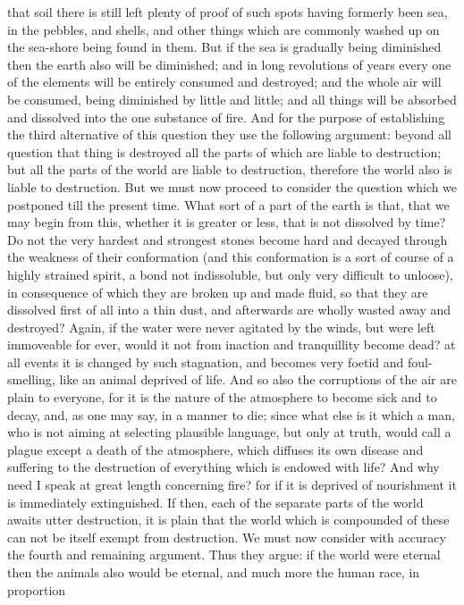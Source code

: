 that soil there is still left plenty of proof of such spots having formerly been sea, in the pebbles, and
shells, and other things which are commonly washed up on the sea-shore being found in them. But
if the sea is gradually being diminished then the earth also will be diminished; and in long
revolutions of years every one of the elements will be entirely consumed and destroyed; and the
whole air will be consumed, being diminished by little and little; and all things will be absorbed and
dissolved into the one substance of fire. And for the purpose of establishing the third alternative of
this question they use the following argument: beyond all question that thing is destroyed all the
parts of which are liable to destruction; but all the parts of the world are liable to destruction,
therefore the world also is liable to destruction. But we must now proceed to consider the question
which we postponed till the present time. What sort of a part of the earth is that, that we may begin
from this, whether it is greater or less, that is not dissolved by time? Do not the very hardest and
strongest stones become hard and decayed through the weakness of their conformation (and this
conformation is a sort of course of a highly strained spirit, a bond not indissoluble, but only very
difficult to unloose), in consequence of which they are broken up and made fluid, so that they are
dissolved first of all into a thin dust, and afterwards are wholly wasted away and destroyed? Again,
if the water were never agitated by the winds, but were left immoveable for ever, would it not from
inaction and tranquillity become dead? at all events it is changed by such stagnation, and becomes
very foetid and foul-smelling, like an animal deprived of life. And so also the corruptions of the air
are plain to everyone, for it is the nature of the atmosphere to become sick and to decay, and, as
one may say, in a manner to die; since what else is it which a man, who is not aiming at selecting
plausible language, but only at truth, would call a plague except a death of the atmosphere, which
diffuses its own disease and suffering to the destruction of everything which is endowed with life?
And why need I speak at great length concerning fire? for if it is deprived of nourishment it is
immediately extinguished. If then, each of the separate parts of the world awaits utter destruction, it
is plain that the world which is compounded of these can not be itself exempt from destruction. We
must now consider with accuracy the fourth and remaining argument. Thus they argue: if the world
were eternal then the animals also would be eternal, and much more the human race, in proportion
